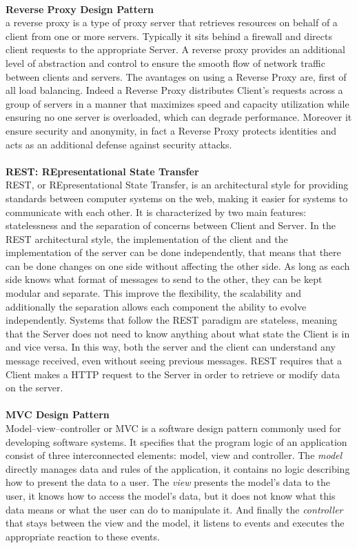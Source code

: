 \documentclass[a4paper, 12pt, oneside, table]{article}
\begin{document}
\\
\textbf{Reverse Proxy Design Pattern}\\
a reverse proxy is a type of proxy server that retrieves resources on behalf of a client from one or more servers. Typically it sits behind a firewall and directs client requests to the appropriate Server. A reverse proxy provides an additional level of abstraction and control to ensure the smooth flow of network traffic between clients and servers. The avantages on using a Reverse Proxy are, first of all load balancing. Indeed a Reverse Proxy distributes Client's requests across a group of servers in a manner that maximizes speed and capacity utilization while ensuring no one server is overloaded, which can degrade performance. Moreover it ensure security and anonymity, in fact a Reverse Proxy protects identities and acts as an additional defense against security attacks.\\
\\
\textbf{REST: REpresentational State Transfer}\\
REST, or REpresentational State Transfer, is an architectural style for providing standards between computer systems on the web, making it easier for systems to communicate with each other. It is characterized by two main features: statelessness and the separation of concerns between Client and Server. In the REST architectural style, the implementation of the client and the implementation of the server can be done independently, that means that there can be done changes on one side without affecting the other side. As long as each side knows what format of messages to send to the other, they can be kept modular and separate. This improve the flexibility, the scalability and  additionally the separation allows each component the ability to evolve independently. Systems that follow the REST paradigm are stateless, meaning that the Server does not need to know anything about what state the Client is in and vice versa. In this way, both the server and the client can understand any message received, even without seeing previous messages. REST requires that a Client makes a HTTP request to the Server in order to retrieve or modify data on the server.\\
\\
\textbf{MVC Design Pattern}\\
Model–view–controller or MVC is a software design pattern commonly used for developing software systems. It specifies that the program logic of an application consist of three interconnected elements: model, view and controller. The \textit{model} directly manages data and rules of the application, it contains no logic describing how to present the data to a user. The \textit{view} presents the model's data to the user, it knows how to access the model’s data, but it does not know what this data means or what the user can do to manipulate it. And finally the \textit{controller} that stays between the view and the model, it listens to events and executes the appropriate reaction to these events.\\
\end{document}
